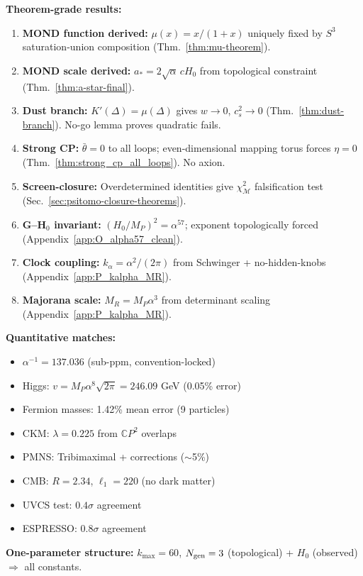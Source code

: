 \begin{tcolorbox}[colback=blue!5!white, colframe=blue!60!black, title=\textbf{DFD: Unified Framework + Falsifiable Predictions}, boxsep=2pt, left=2pt, right=2pt]
\small
\textbf{Theorem-grade results:}
\begin{enumerate}[nosep, leftmargin=*]
\item \textbf{MOND function derived:} $\mu(x) = x/(1+x)$ uniquely fixed by $S^3$ saturation-union composition (Thm.~\ref{thm:mu-theorem}).
\item \textbf{MOND scale derived:} $a_* = 2\sqrt{\alpha}\,cH_0$ from topological constraint (Thm.~\ref{thm:a-star-final}).
\item \textbf{Dust branch:} $K'(\Delta)=\mu(\Delta)$ gives $w \to 0$, $c_s^2 \to 0$ (Thm.~\ref{thm:dust-branch}). No-go lemma proves quadratic fails.
\item \textbf{Strong CP:} $\bar{\theta} = 0$ to all loops; even-dimensional mapping torus forces $\eta = 0$ (Thm.~\ref{thm:strong_cp_all_loops}). No axion.
\item \textbf{Screen-closure:} Overdetermined identities give $\chi^2_{\mathcal{M}}$ falsification test (Sec.~\ref{sec:psitomo-closure-theorems}).
\item \textbf{G--H$_0$ invariant:} $(H_0/M_P)^2 = \alpha^{57}$; exponent topologically forced (Appendix~\ref{app:O_alpha57_clean}).
\item \textbf{Clock coupling:} $k_\alpha = \alpha^2/(2\pi)$ from Schwinger + no-hidden-knobs (Appendix~\ref{app:P_kalpha_MR}).
\item \textbf{Majorana scale:} $M_R = M_P\alpha^3$ from determinant scaling (Appendix~\ref{app:P_kalpha_MR}).
\end{enumerate}

\textbf{Quantitative matches:}
\begin{itemize}[nosep, leftmargin=*]
\item $\alpha^{-1} = 137.036$ (sub-ppm, convention-locked)
\item Higgs: $v = M_P\alpha^8\sqrt{2\pi} = 246.09$ GeV (0.05\% error)
\item Fermion masses: 1.42\% mean error (9 particles)
\item CKM: $\lambda = 0.225$ from $\mathbb{C}P^2$ overlaps
\item PMNS: Tribimaximal + corrections ($\sim$5\%)
\item CMB: $R = 2.34$, $\ell_1 = 220$ (no dark matter)
\item UVCS test: $0.4\sigma$ agreement
\item ESPRESSO: $0.8\sigma$ agreement
\end{itemize}

\textbf{One-parameter structure:} $k_{\max} = 60$, $N_{\rm gen} = 3$ (topological) + $H_0$ (observed) $\Rightarrow$ all constants.
\end{tcolorbox}
